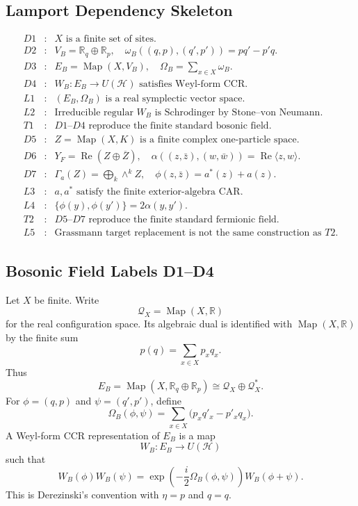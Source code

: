 \subsection{Lamport Dependency Skeleton}
\[
\begin{array}{rcl}
D1&:&X\text{ is a finite set of sites.}\\
D2&:&V_B=\mathbb R_q\oplus\mathbb R_p,\quad
       \omega_B((q,p),(q',p'))=pq'-p'q.\\
D3&:&E_B=\operatorname{Map}(X,V_B),\quad
       \Omega_B=\sum_{x\in X}\omega_B.\\
D4&:&W_B:E_B\to U(\mathcal H)\text{ satisfies Weyl-form CCR.}\\
L1&:&(E_B,\Omega_B)\text{ is a real symplectic vector space.}\\
L2&:&\text{Irreducible regular }W_B\text{ is Schrodinger by Stone--von Neumann.}\\
T1&:&D1\text{--}D4\text{ reproduce the finite standard bosonic field.}\\[1mm]
D5&:&Z=\operatorname{Map}(X,K)\text{ is a finite complex one-particle space.}\\
D6&:&Y_F=\operatorname{Re}(Z\oplus\overline Z),\quad
       \alpha((z,\bar z),(w,\bar w))=\operatorname{Re}\langle z,w\rangle.\\
D7&:&\Gamma_a(Z)=\bigoplus_k\wedge^k Z,\quad
       \phi(z,\bar z)=a^*(z)+a(z).\\
L3&:&a,a^*\text{ satisfy the finite exterior-algebra CAR.}\\
L4&:&\{\phi(y),\phi(y')\}=2\alpha(y,y').\\
T2&:&D5\text{--}D7\text{ reproduce the finite standard fermionic field.}\\
L5&:&\text{Grassmann target replacement is not the same construction as }T2.
\end{array}
\]

\subsection{Bosonic Field Labels D1--D4}
Let \(X\) be finite.  Write
\[
  \mathcal Q_X=\operatorname{Map}(X,\mathbb R)
\]
for the real configuration space.  Its algebraic dual is identified with
\(\operatorname{Map}(X,\mathbb R)\) by the finite sum
\[
  p(q)=\sum_{x\in X}p_xq_x.
\]
Thus
\[
  E_B=\operatorname{Map}(X,\mathbb R_q\oplus\mathbb R_p)
      \cong \mathcal Q_X\oplus\mathcal Q_X^*.
\]
For \(\phi=(q,p)\) and \(\psi=(q',p')\), define
\[
  \Omega_B(\phi,\psi)
  =
  \sum_{x\in X}\bigl(p_xq'_x-p'_xq_x\bigr).
\]
A Weyl-form CCR representation of \(E_B\) is a map
\[
  W_B:E_B\to U(\mathcal H)
\]
such that
\[
  W_B(\phi)W_B(\psi)
  =
  \exp\!\left(-\frac{i}{2}\Omega_B(\phi,\psi)\right)W_B(\phi+\psi).
\]
This is Derezinski's convention with \(\eta=p\) and \(q=q\).

